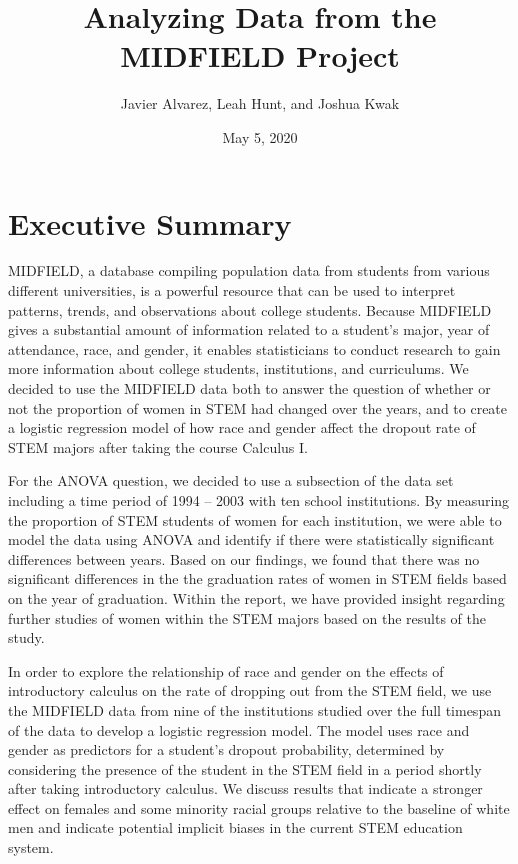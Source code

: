 \documentclass[]{article}
\title{Analyzing Data from the MIDFIELD Project}
\author{Javier Alvarez, Leah Hunt, and Joshua Kwak}
\date{May 5, 2020}
\begin{document}
\maketitle

\newpage

\section{Executive Summary}\label{executive-summary}

MIDFIELD, a database compiling population data from students from
various different universities, is a powerful resource that can be used
to interpret patterns, trends, and observations about college students.
Because MIDFIELD gives a substantial amount of information related to a
student's major, year of attendance, race, and gender, it enables
statisticians to conduct research to gain more information about college
students, institutions, and curriculums. We decided to use the MIDFIELD
data both to answer the question of whether or not the proportion of
women in STEM had changed over the years, and to create a logistic
regression model of how race and gender affect the dropout rate of STEM
majors after taking the course Calculus I.

For the ANOVA question, we decided to use a subsection of the data set
including a time period of 1994 -- 2003 with ten school institutions. By
measuring the proportion of STEM students of women for each institution,
we were able to model the data using ANOVA and identify if there were
statistically significant differences between years. Based on our
findings, we found that there was no significant differences in the the
graduation rates of women in STEM fields based on the year of
graduation. Within the report, we have provided insight regarding
further studies of women within the STEM majors based on the results of
the study.

In order to explore the relationship of race and gender on the effects
of introductory calculus on the rate of dropping out from the STEM
field, we use the MIDFIELD data from nine of the institutions studied
over the full timespan of the data to develop a logistic regression
model. The model uses race and gender as predictors for a student's
dropout probability, determined by considering the presence of the
student in the STEM field in a period shortly after taking introductory
calculus. We discuss results that indicate a stronger effect on females
and some minority racial groups relative to the baseline of white men
and indicate potential implicit biases in the current STEM education
system.
\end{document}

